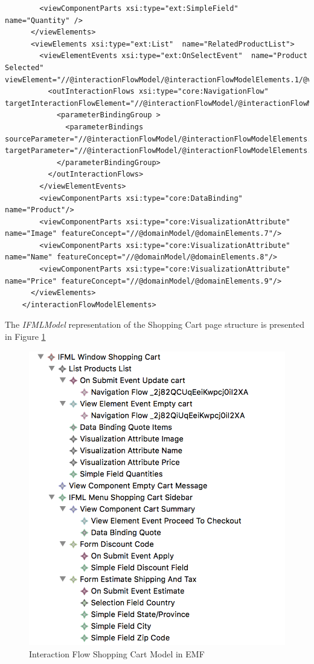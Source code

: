 \begin{lstlisting}
        <viewComponentParts xsi:type="ext:SimpleField"  name="Quantity" />
      </viewElements>
      <viewElements xsi:type="ext:List"  name="RelatedProductList">
        <viewElementEvents xsi:type="ext:OnSelectEvent"  name="Product Selected" viewElement="//@interactionFlowModel/@interactionFlowModelElements.1/@viewElements.2">
          <outInteractionFlows xsi:type="core:NavigationFlow"  targetInteractionFlowElement="//@interactionFlowModel/@interactionFlowModelElements.1">
            <parameterBindingGroup >
              <parameterBindings  sourceParameter="//@interactionFlowModel/@interactionFlowModelElements.0/@viewElements.2/@parameters.0" targetParameter="//@interactionFlowModel/@interactionFlowModelElements.1/@parameters.0"/>
            </parameterBindingGroup>
          </outInteractionFlows>
        </viewElementEvents>
        <viewComponentParts xsi:type="core:DataBinding"  name="Product"/>
        <viewComponentParts xsi:type="core:VisualizationAttribute"  name="Image" featureConcept="//@domainModel/@domainElements.7"/>
        <viewComponentParts xsi:type="core:VisualizationAttribute"  name="Name" featureConcept="//@domainModel/@domainElements.8"/>
        <viewComponentParts xsi:type="core:VisualizationAttribute"  name="Price" featureConcept="//@domainModel/@domainElements.9"/>
      </viewElements>
    </interactionFlowModelElements>
\end{lstlisting}

The \textit{IFMLModel} representation of the Shopping Cart page structure is presented in Figure \ref{fig:ifml-before-hierarchy-shoppingcart}

\vspace{0.5cm}
\begin{figure}[H]
  \centering
    \includegraphics[width=12cm]{images/diagrams/before/ifml-hierarchy-shoppingcart.png}
  \caption{Interaction Flow Shopping Cart Model in EMF}
  \label{fig:ifml-before-hierarchy-shoppingcart}
\end{figure}
\vspace{0.5cm}

